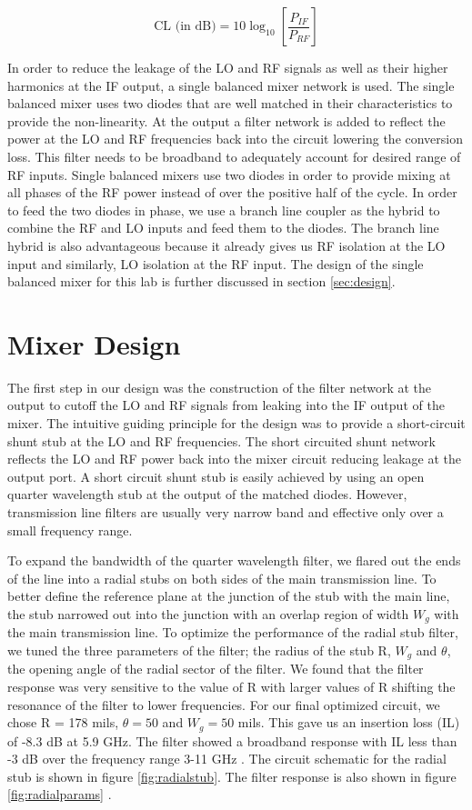 \documentclass[twocolumn, aps, floatfix]{revtex4-1}
\begin{document}
\begin{equation}
    \textrm{CL (in dB)} = 10 \log_{10} \left[\frac{P_{IF}}{P_{RF}}\right]
\end{equation}

In order to reduce the leakage of the LO and RF signals as well as their higher harmonics at the IF output, a single balanced mixer network is used. The single balanced mixer uses two diodes that are well matched in their characteristics to provide the non-linearity. At the output a filter network is added to reflect the power at the LO and RF frequencies back into the circuit lowering the conversion loss. This filter needs to be broadband to adequately account for desired range of RF inputs. Single balanced mixers use two diodes in order to provide mixing at all phases of the RF power instead of over the positive half of the cycle. In order to feed the two diodes in phase, we use a branch line coupler as the hybrid to combine the RF and LO inputs and feed them to the diodes. The branch line hybrid is also advantageous because it already gives us RF isolation at the LO input and similarly, LO isolation at the RF input. The design of the single balanced mixer for this lab is further discussed in section \ref{sec:design}.


\section*{Mixer Design}\label{sec:design}

The first step in our design was the construction of the filter network at the output to cutoff the LO and RF signals from leaking into the IF output of the mixer. The intuitive guiding principle for the design was to provide a short-circuit shunt stub at the LO and RF frequencies. The short circuited shunt network reflects the LO and RF power back into the mixer circuit reducing leakage at the output port. A short circuit shunt stub is easily achieved by using an open quarter wavelength stub at the output of the matched diodes. However, transmission line filters are usually very narrow band and effective only over a small frequency range. 

To expand the bandwidth of the quarter wavelength filter, we flared out the ends of the line into a radial stubs on both sides of the main transmission line. To better define the reference plane at the junction of the stub with the main line, the stub narrowed out into the junction with an overlap region of width $W_g$ with the main transmission line. To optimize the performance of the radial stub filter, we tuned the three parameters of the filter; the radius of the stub R, $W_g$ and $\theta$, the opening angle of the radial sector of the filter. We found that the filter response was very sensitive to the value of R with larger values of R shifting the resonance of the filter to lower frequencies. For our final optimized circuit, we chose R = 178 mils, $\theta = 50$ \textdegree and $W_g = 50$ mils. This gave us an insertion loss (IL) of -8.3 dB at 5.9 GHz. The filter showed a broadband response with IL less than -3 dB over the frequency range 3-11 GHz . The circuit schematic for the radial stub is shown in figure \ref{fig:radialstub}. The filter response is also shown in figure \ref{fig:radialparams} .
\end{document}
